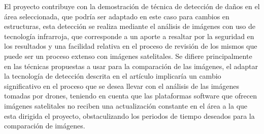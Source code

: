 \begin{itemize}
    El proyecto contribuye con la demostración de técnica de detección de daños en el área seleccionada, que podría ser adaptado en este caso para cambios en estructuras, esta detección se realiza mediante el análisis de imágenes con uso de tecnología infrarroja, que corresponde a un aporte a resaltar por la seguridad en los resultados y una facilidad relativa en el proceso de revisión de los mismos que puede ser un proceso extenso con imágenes satelitales.
    Se difiere principalmente en las técnicas propuestas a usar para la comparación de las imágenes, el adaptar la tecnología de detección descrita en el artículo implicaría un cambio significativo en el proceso que se desea llevar con el análisis de las imágenes tomadas por drones, teniendo en cuenta que las plataformas software que ofrecen imágenes satelitales no reciben una actualización constante en el área a la que esta dirigida el proyecto, obstaculizando los periodos de tiempo deseados para la comparación de imágenes.
    \end{itemize}
